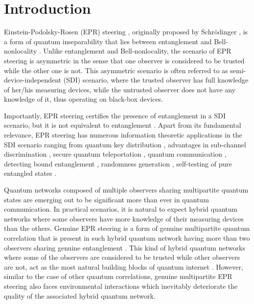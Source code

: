 \documentclass[reprint,superscriptaddress,nofootinbib,amsmath,amssymb,aps,pra,longbibliography]{revtex4-1}
\begin{document}




\maketitle



\section{Introduction}

Einstein-Podolsky-Rosen (EPR) steering \cite{Wiseman07,Jones07,Costa20}, originally proposed by Schrödinger  \cite{Schrodinger35}, is a form of quantum inseparability that lies  between entanglement \cite{Horo09} and Bell-nonlocality \cite{Brunner14}. Unlike entanglement and Bell-nonlocality, the scenario of EPR steering is asymmetric in the sense that one observer is considered to be trusted while the other one is not.  This asymmetric scenario is often referred to as  semi-device-independent (SDI)  scenario, where the trusted observer has full knowledge of her/his measuring devices, while the untrusted observer does not have any knowledge of it, thus operating on black-box devices.

Importantly, EPR steering certifies the presence of entanglement in a SDI scenario, but it is not equivalent to entanglement \cite{Wiseman07}. Apart from its fundamental relevance, EPR steering has numerous information theoretic applications in the SDI scenario ranging from quantum key distribution \cite{Cyril12}, advantages in sub-channel discrimination \cite{Piani15}, secure quantum teleportation \cite{Reid13,He15}, quantum communication \cite{Reid13}, detecting bound entanglement \cite{Moroder14}, randomness generation \cite{Law2014,Passaro2015,Skrzypczyk18,Coyle2018}, self-testing of pure entangled states \cite{supic2016,Gheorghiu2017,Goswami18,Bian20,shrotriya20}.
 
Quantum networks composed of multiple observers sharing multipartite quantum states are emerging out to be significant more than ever in quantum communication. In practical scenarios, it is natural to expect hybrid quantum networks where some observers have more knowledge of their measuring devices than the others. Genuine EPR steering \cite{Cavalcanti11,He13,Li15,Cavalcanti15,Cavalcanti16,Bihalan18,Riccardi18} is a form of genuine multipartite quantum correlation that is present in such hybrid quantum network having more than two observers sharing genuine entanglement \cite{GUHNE91}. This kind of hybrid quantum networks where some of the observers are considered to be trusted while other observers are not, act as the most natural building blocks of quantum internet \cite{Kimble2008}. However, similar to the case of other quantum correlations, genuine multipartite EPR steering also faces environmental interactions which inevitably deteriorate the quality of the associated hybrid quantum network. 
 
\end{document}
